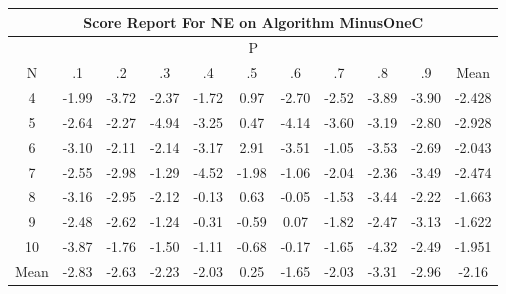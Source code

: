 \documentclass[11pt,a4paper]{report}
\begin{document}
\begin{longtable}{ | c || c | c | c | c | c | c | c | c | c || c |}
\hline
\multicolumn{11}{|c|}{ Score Report For NE on Algorithm MinusOneC} \\
\hline
\multicolumn{11}{|c|}{ P } \\
\hline
N & .1 & .2 & .3 & .4 & .5 & .6 & .7 & .8 & .9 & Mean\\
 \hline
 \hline
 \endhead
  4 &  \cellcolor[HTML]{FFCFCF} -1.99 &  \cellcolor[HTML]{FF9F9F} -3.72 &  \cellcolor[HTML]{FFC7C7} -2.37 &  \cellcolor[HTML]{FFD7D7} -1.72 &  \cellcolor[HTML]{E7E7FF} 0.97 &  \cellcolor[HTML]{FFB7B7} -2.70 &  \cellcolor[HTML]{FFBFBF} -2.52 &  \cellcolor[HTML]{FF9F9F} -3.89 &  \cellcolor[HTML]{FF9F9F} -3.90 & -2.428 \\
  5 &  \cellcolor[HTML]{FFBFBF} -2.64 &  \cellcolor[HTML]{FFC7C7} -2.27 &  \cellcolor[HTML]{FF8080} -4.94 &  \cellcolor[HTML]{FFAFAF} -3.25 &  \cellcolor[HTML]{F7F7FF} 0.47 &  \cellcolor[HTML]{FF9797} -4.14 &  \cellcolor[HTML]{FFA7A7} -3.60 &  \cellcolor[HTML]{FFAFAF} -3.19 &  \cellcolor[HTML]{FFB7B7} -2.80 & -2.928 \\
  6 &  \cellcolor[HTML]{FFAFAF} -3.10 &  \cellcolor[HTML]{FFC7C7} -2.11 &  \cellcolor[HTML]{FFC7C7} -2.14 &  \cellcolor[HTML]{FFAFAF} -3.17 &  \cellcolor[HTML]{B7B7FF} 2.91 &  \cellcolor[HTML]{FFA7A7} -3.51 &  \cellcolor[HTML]{FFE7E7} -1.05 &  \cellcolor[HTML]{FFA7A7} -3.53 &  \cellcolor[HTML]{FFBFBF} -2.69 & -2.043 \\
  7 &  \cellcolor[HTML]{FFBFBF} -2.55 &  \cellcolor[HTML]{FFB7B7} -2.98 &  \cellcolor[HTML]{FFDFDF} -1.29 &  \cellcolor[HTML]{FF8F8F} -4.52 &  \cellcolor[HTML]{FFCFCF} -1.98 &  \cellcolor[HTML]{FFE7E7} -1.06 &  \cellcolor[HTML]{FFCFCF} -2.04 &  \cellcolor[HTML]{FFC7C7} -2.36 &  \cellcolor[HTML]{FFA7A7} -3.49 & -2.474 \\
  8 &  \cellcolor[HTML]{FFAFAF} -3.16 &  \cellcolor[HTML]{FFB7B7} -2.95 &  \cellcolor[HTML]{FFC7C7} -2.12 &  \cellcolor[HTML]{FFFFFF} -0.13 &  \cellcolor[HTML]{EFEFFF} 0.63 &  \cellcolor[HTML]{FFFFFF} -0.05 &  \cellcolor[HTML]{FFD7D7} -1.53 &  \cellcolor[HTML]{FFA7A7} -3.44 &  \cellcolor[HTML]{FFC7C7} -2.22 & -1.663 \\
  9 &  \cellcolor[HTML]{FFBFBF} -2.48 &  \cellcolor[HTML]{FFBFBF} -2.62 &  \cellcolor[HTML]{FFDFDF} -1.24 &  \cellcolor[HTML]{FFF7F7} -0.31 &  \cellcolor[HTML]{FFEFEF} -0.59 &  \cellcolor[HTML]{FFFFFF} 0.07 &  \cellcolor[HTML]{FFCFCF} -1.82 &  \cellcolor[HTML]{FFBFBF} -2.47 &  \cellcolor[HTML]{FFAFAF} -3.13 & -1.622 \\
  10 &  \cellcolor[HTML]{FF9F9F} -3.87 &  \cellcolor[HTML]{FFCFCF} -1.76 &  \cellcolor[HTML]{FFD7D7} -1.50 &  \cellcolor[HTML]{FFE7E7} -1.11 &  \cellcolor[HTML]{FFEFEF} -0.68 &  \cellcolor[HTML]{FFF7F7} -0.17 &  \cellcolor[HTML]{FFD7D7} -1.65 &  \cellcolor[HTML]{FF8F8F} -4.32 &  \cellcolor[HTML]{FFBFBF} -2.49 & -1.951 \\
 \hline
 \hline
Mean &  \cellcolor[HTML]{FFB7B7} -2.83 &  \cellcolor[HTML]{FFBFBF} -2.63 &  \cellcolor[HTML]{FFC7C7} -2.23 &  \cellcolor[HTML]{FFCFCF} -2.03 &  \cellcolor[HTML]{F7F7FF} 0.25 &  \cellcolor[HTML]{FFD7D7} -1.65 &  \cellcolor[HTML]{FFCFCF} -2.03 &  \cellcolor[HTML]{FFAFAF} -3.31 &  \cellcolor[HTML]{FFB7B7} -2.96 &  \cellcolor[HTML]{FFC7C7} -2.16
\end{longtable}
\end{document}
